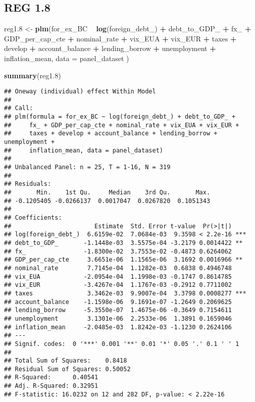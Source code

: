 \documentclass[]{article}
\newenvironment{Shaded}{\begin{snugshade}}{\end{snugshade}}
\newcommand{\KeywordTok}[1]{\textcolor[rgb]{0.13,0.29,0.53}{\textbf{#1}}}
\newcommand{\DataTypeTok}[1]{\textcolor[rgb]{0.13,0.29,0.53}{#1}}
\newcommand{\DecValTok}[1]{\textcolor[rgb]{0.00,0.00,0.81}{#1}}
\newcommand{\StringTok}[1]{\textcolor[rgb]{0.31,0.60,0.02}{#1}}
\newcommand{\OperatorTok}[1]{\textcolor[rgb]{0.81,0.36,0.00}{\textbf{#1}}}
\newcommand{\NormalTok}[1]{#1}
\begin{document}
\subsection{REG 1.8}\label{reg-1.8}

\begin{Shaded}
\begin{Highlighting}[]
\NormalTok{reg1.}\DecValTok{8}\NormalTok{ <-}\StringTok{ }\KeywordTok{plm}\NormalTok{(for_ex_BC }\OperatorTok{~}\StringTok{  }\KeywordTok{log}\NormalTok{(foreign_debt_) }\OperatorTok{+}\StringTok{ }\NormalTok{debt_to_GDP_ }\OperatorTok{+}\StringTok{ }\NormalTok{fx_ }\OperatorTok{+}\StringTok{ }\NormalTok{GDP_per_cap_cte }\OperatorTok{+}\StringTok{ }\NormalTok{nominal_rate }\OperatorTok{+}\StringTok{ }\NormalTok{vix_EUA }\OperatorTok{+}\StringTok{ }\NormalTok{vix_EUR }\OperatorTok{+}\StringTok{ }\NormalTok{taxes }\OperatorTok{+}\StringTok{ }\NormalTok{develop }\OperatorTok{+}\StringTok{ }\NormalTok{account_balance }\OperatorTok{+}\StringTok{ }\NormalTok{lending_borrow }\OperatorTok{+}\StringTok{ }\NormalTok{unemployment }\OperatorTok{+}\StringTok{ }\NormalTok{inflation_mean, }\DataTypeTok{data =}\NormalTok{ panel_dataset )}

\KeywordTok{summary}\NormalTok{(reg1.}\DecValTok{8}\NormalTok{)}
\end{Highlighting}
\end{Shaded}

\begin{verbatim}
## Oneway (individual) effect Within Model
## 
## Call:
## plm(formula = for_ex_BC ~ log(foreign_debt_) + debt_to_GDP_ + 
##     fx_ + GDP_per_cap_cte + nominal_rate + vix_EUA + vix_EUR + 
##     taxes + develop + account_balance + lending_borrow + unemployment + 
##     inflation_mean, data = panel_dataset)
## 
## Unbalanced Panel: n = 25, T = 1-16, N = 319
## 
## Residuals:
##       Min.    1st Qu.     Median    3rd Qu.       Max. 
## -0.1205405 -0.0266137  0.0017047  0.0267820  0.1051343 
## 
## Coefficients:
##                       Estimate  Std. Error t-value  Pr(>|t|)    
## log(foreign_debt_)  6.6159e-02  7.0684e-03  9.3598 < 2.2e-16 ***
## debt_to_GDP_       -1.1448e-03  3.5575e-04 -3.2179 0.0014422 ** 
## fx_                -1.8300e-02  3.7553e-02 -0.4873 0.6264062    
## GDP_per_cap_cte     3.6651e-06  1.1565e-06  3.1692 0.0016966 ** 
## nominal_rate        7.7145e-04  1.1282e-03  0.6838 0.4946748    
## vix_EUA            -2.0954e-04  1.1998e-03 -0.1747 0.8614785    
## vix_EUR            -3.4267e-04  1.1767e-03 -0.2912 0.7711002    
## taxes               3.3462e-03  9.9007e-04  3.3798 0.0008277 ***
## account_balance    -1.1598e-06  9.1691e-07 -1.2649 0.2069625    
## lending_borrow     -5.3550e-07  1.4675e-06 -0.3649 0.7154611    
## unemployment        3.1301e-06  2.2533e-06  1.3891 0.1659046    
## inflation_mean     -2.0485e-03  1.8242e-03 -1.1230 0.2624106    
## ---
## Signif. codes:  0 '***' 0.001 '**' 0.01 '*' 0.05 '.' 0.1 ' ' 1
## 
## Total Sum of Squares:    0.8418
## Residual Sum of Squares: 0.50052
## R-Squared:      0.40541
## Adj. R-Squared: 0.32951
## F-statistic: 16.0232 on 12 and 282 DF, p-value: < 2.22e-16
\end{verbatim}
\end{document}
